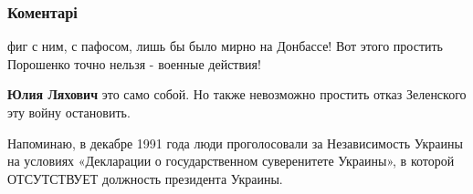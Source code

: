  
 
 
 
 
\subsubsection{Коментарі}
\label{sec:27_08_2021.fb.voloshin_oleg.opzzh.1.ritorika_nezalezhnist.cmt}

\begin{itemize}
\par
 
фиг с ним, с пафосом, лишь бы было мирно на Донбассе! Вот этого простить Порошенко точно нельзя - военные действия!

 
\textbf{Юлия Ляхович} это само собой. Но также невозможно простить отказ Зеленского эту войну остановить.

\par
 

Напоминаю, в декабре 1991 года люди проголосовали за Независимость Украины на
условиях «Декларации о государственном суверенитете Украины», в которой
ОТСУТСТВУЕТ должность президента Украины.
\end{itemize}

